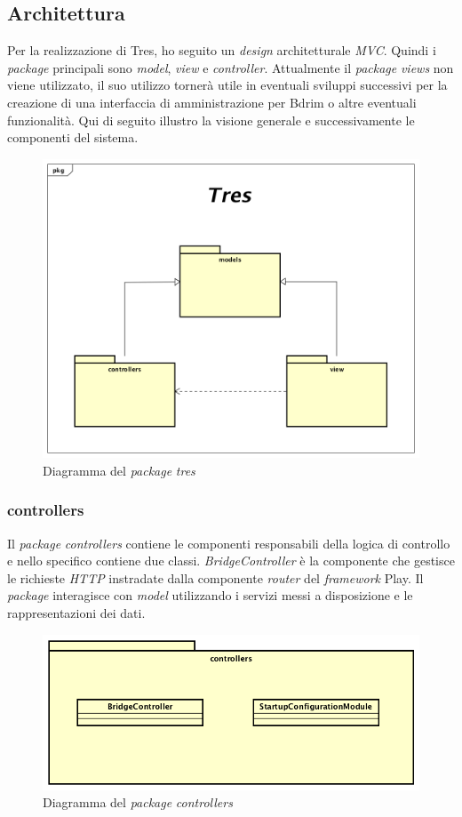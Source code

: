 \subsection{Architettura}
Per la realizzazione di Tres, ho seguito un \emph{design} architetturale \emph{MVC}. Quindi i \emph{package} principali sono \emph{model}, \emph{view} e \emph{controller}. Attualmente il \emph{package} \emph{views} non viene utilizzato, il suo utilizzo tornerà utile in eventuali sviluppi successivi per la creazione di una interfaccia di amministrazione per Bdrim o altre eventuali funzionalità. Qui di seguito illustro la visione generale e successivamente le componenti del sistema.  
\begin{figure}[h]
\centering
\includegraphics[scale=0.35]{immagini/architetturamvc}
\caption{Diagramma del \emph{package} \emph{tres}}
\label{fig:pack-tres}
\end{figure}
\newpage
\subsubsection{controllers}%
Il \emph{package} \emph{controllers} contiene le componenti responsabili della logica di controllo e nello specifico contiene due classi. \emph{BridgeController} è la componente che gestisce le richieste \emph{HTTP} instradate dalla componente \emph{router} del \emph{framework} Play. Il \emph{package} interagisce con \emph{model} utilizzando i servizi messi a disposizione e le rappresentazioni dei dati.
\begin{figure}[h]
\centering
\includegraphics[scale=0.35]{immagini/controllers}
\caption{Diagramma del \emph{package} \emph{controllers}}
\label{fig:pack-controller}
\end{figure}
